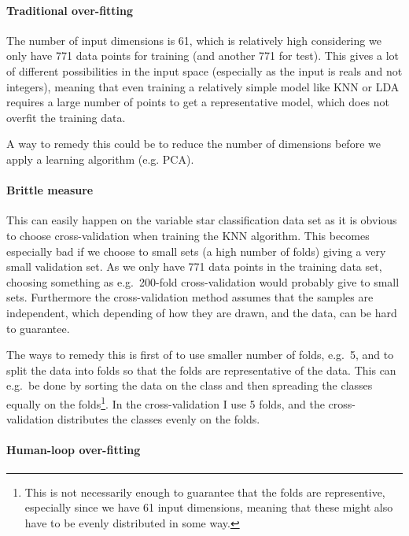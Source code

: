 \documentclass[a4paper, 11pt]{article}
\begin{document}
\paragraph{Traditional over-fitting} %
\label{par:traditional_over_fitting}

The number of input dimensions is 61, which is relatively high considering we only have 771 data points for training (and another 771 for test). This gives a lot of different possibilities in the input space (especially as the input is reals and not integers), meaning that even training a relatively simple model like KNN or LDA requires a large number of points to get a representative model, which does not overfit the training data.

A way to remedy this could be to reduce the number of dimensions before we apply a learning algorithm (e.g. PCA).


\paragraph{Brittle measure} %
\label{par:brittle_measure}

This can easily happen on the variable star classification data set as it is obvious to choose cross-validation when training the KNN algorithm. This becomes especially bad if we choose to small sets (a high number of folds) giving a very small validation set. As we only have 771 data points in the training data set, choosing something as e.g.\ 200-fold cross-validation would probably give to small sets. Furthermore the cross-validation method assumes that the samples are independent, which depending of how they are drawn, and the data, can be hard to guarantee.

The ways to remedy this is first of to use smaller number of folds, e.g.\ 5, and to split the data into folds so that the folds are representative of the data. This can e.g.\ be done by sorting the data on the class and then spreading the classes equally on the folds\footnote{This is not necessarily enough to guarantee that the folds are representive, especially since we have 61 input dimensions, meaning that these might also have to be evenly distributed in some way.}. In the cross-validation I use 5 folds, and the cross-validation distributes the classes evenly on the folds.


\paragraph{Human-loop over-fitting} %
\label{par:human_loop_over_fitting}
\end{document}
